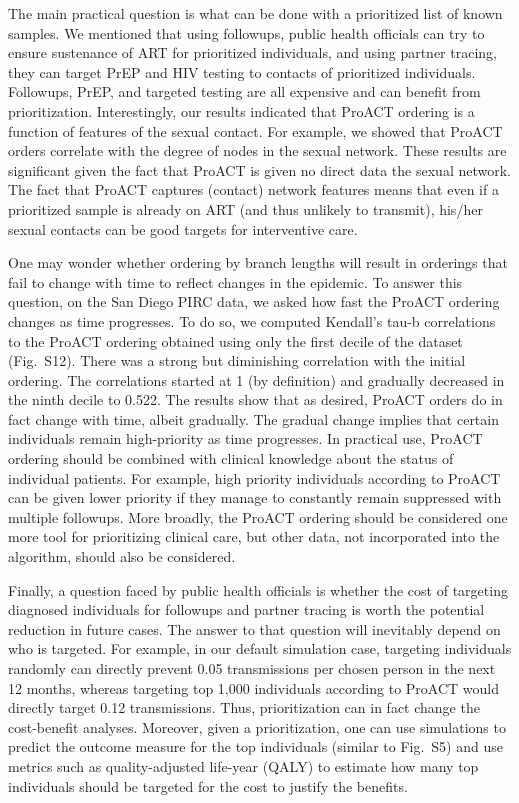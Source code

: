 \documentclass[a4paper,11pt]{article}
\newcommand{\PLWH}{sample\xspace}
\begin{document}
The main practical question  is what can be done with a prioritized list of known \PLWH{s}.
We mentioned that using followups, public health officials can try to ensure sustenance of ART for prioritized individuals, and using partner tracing, they can target PrEP and HIV testing to contacts of  prioritized individuals. Followups, PrEP, and targeted testing are all expensive and can benefit from prioritization. 
Interestingly, 
our results indicated that ProACT ordering is a function of features of the sexual contact. 
For example, we showed that ProACT orders correlate with the degree of nodes in the sexual network.
These results are significant given the fact that ProACT is given no direct data the sexual network. 
The fact that ProACT captures (contact) network features means that even if a prioritized \PLWH is already on ART (and thus unlikely to transmit), his/her sexual contacts can be good targets for interventive care. 


One may wonder whether ordering by branch lengths will result in orderings that fail to change with time to reflect changes in the epidemic.
To answer this question,
on the San Diego PIRC data, we asked how fast the  ProACT ordering changes as time progresses. To do so, we computed Kendall's tau-b correlations to the ProACT ordering obtained using only the first decile of the dataset (Fig.~S12). There was a strong but diminishing correlation with the initial ordering. The correlations started at 1 (by definition) and gradually decreased in the ninth decile to 0.522. 
The results show that as desired,  ProACT orders do in fact change with time, albeit gradually.
The gradual change implies that certain individuals remain high-priority as time progresses. 
In practical use, ProACT ordering should be combined with clinical knowledge about the status of individual patients. For example, high priority individuals according to ProACT can be given lower priority if they manage to constantly remain suppressed with multiple followups.
More broadly, the ProACT ordering should be considered one more tool for prioritizing clinical care, but other data, not incorporated into the algorithm, should also be considered. 

Finally, a question faced by public health officials is whether the cost of targeting diagnosed individuals for followups and partner tracing is worth the potential reduction in future cases. 
The answer to that question will inevitably depend on who is targeted.
For example, in our default simulation case, targeting individuals randomly can directly prevent 0.05 transmissions per chosen person  in the next 12 months, whereas targeting top 1,000 individuals according to ProACT would directly target 0.12 transmissions. 
Thus, prioritization can in fact change the cost-benefit analyses. 
Moreover, given a prioritization, one can use simulations to predict the outcome measure for the top individuals (similar to Fig.~S5) and use metrics such as quality-adjusted life-year (QALY) to estimate how many top individuals should be targeted for the cost to justify the benefits.
\end{document}

